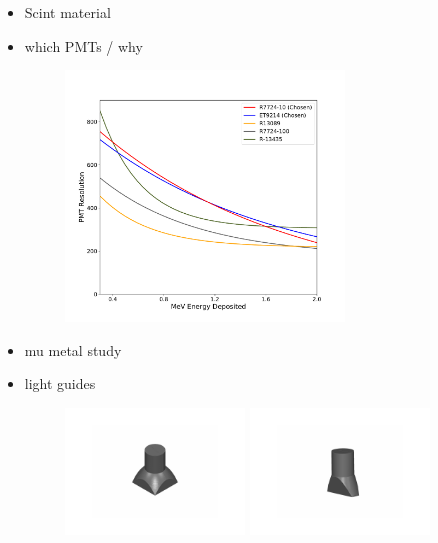 \documentclass[review]{elsarticle}
\begin{document}
\begin{itemize}
\item Scint material
\item which PMTs / why
\begin{figure}[h!]
\centering
\includegraphics[width=0.7\textwidth]{test-stand/test-resolutions.pdf}
\caption{}
\label{fig:bandpmts}
\end{figure}

\item mu metal study
\item light guides
\begin{figure}[h!]
\centering
\includegraphics[width=0.45\textwidth]{parts/bar_lg.pdf}
\includegraphics[width=0.45\textwidth]{parts/veto_lg.pdf}
\caption{}
\label{fig:bandlg}
\end{figure}


\end{itemize}
\end{document}

